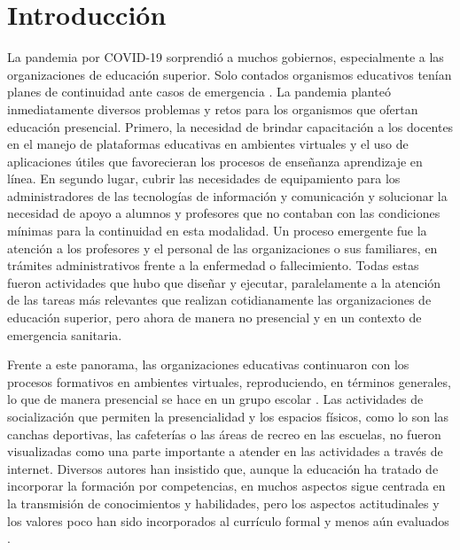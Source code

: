 \documentclass[spanish]{textolivre}
\begin{document}
\section{Introducción}\label{sec-intro}
La pandemia por COVID-19 sorprendió a muchos gobiernos, especialmente a las organizaciones de educación superior. Solo contados organismos educativos tenían planes de continuidad ante casos de emergencia \cite{escuderohanon-ramirez2021, vicario}. %
La pandemia planteó inmediatamente diversos problemas y retos para los organismos que ofertan educación presencial. Primero, la necesidad de brindar capacitación a los docentes en el manejo de plataformas educativas en ambientes virtuales y el uso de aplicaciones útiles que favorecieran los procesos de enseñanza aprendizaje en línea. En segundo lugar, cubrir las necesidades de equipamiento para los administradores de las tecnologías de información y comunicación y solucionar la necesidad de apoyo a alumnos y profesores que no contaban con las condiciones mínimas para la continuidad en esta modalidad. Un proceso emergente fue la atención a los profesores y el personal de las organizaciones o sus familiares, en trámites administrativos frente a la enfermedad o fallecimiento.  Todas estas fueron actividades que hubo que diseñar y ejecutar, paralelamente a la atención de las tareas más relevantes que realizan cotidianamente las organizaciones de educación superior, pero ahora de manera no presencial y en un contexto de emergencia sanitaria. 

Frente a este panorama, las organizaciones educativas continuaron con los procesos formativos en ambientes virtuales, reproduciendo, en términos generales, lo que de manera presencial se hace en un grupo escolar \cite{escuderonahon2021}. Las actividades de socialización que permiten la presencialidad y los espacios físicos, como lo son las canchas deportivas, las cafeterías o las áreas de recreo en las escuelas, no fueron visualizadas como una parte importante a atender en las actividades a través de internet. Diversos autores \cite{cejasmartinez2019, asuninostroza2013} han insistido que, aunque la educación ha tratado de incorporar la formación por competencias, en muchos aspectos sigue centrada en la transmisión de conocimientos y habilidades, pero los aspectos actitudinales y los valores poco han sido incorporados al currículo formal y menos aún evaluados \cite{davis2015}.
\end{document}
